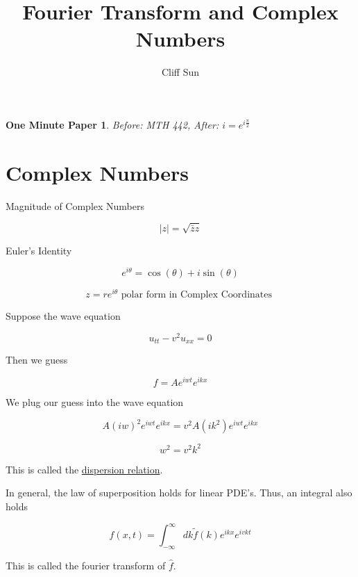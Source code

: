 \documentclass{article}
\title{Fourier Transform and Complex Numbers}
\author{Cliff Sun}
\newtheorem{one minute paper}[theorem]{One Minute Paper}
\begin{document}
\maketitle

\begin{one minute paper}
    Before: MTH 442, After: $i = e^{i\frac{\pi}{2}}$
\end{one minute paper}

\section*{Complex Numbers}

Magnitude of Complex Numbers

\begin{equation}
    |z| = \sqrt{\bar{z}z}
\end{equation}

Euler's Identity

\begin{equation}
    e^{i\theta} = \cos(\theta) + i\sin(\theta)
\end{equation}

\begin{equation}
    z = re^{i\theta} \textrm{ polar form in Complex Coordinates }
\end{equation}

Suppose the wave equation

\begin{equation}
    u_{tt} - v^2u_{xx} = 0
\end{equation}

Then we guess 

\begin{equation}
    f = Ae^{iwt}e^{ikx}
\end{equation}

We plug our guess into the wave equation

\begin{equation}
    A(iw)^2e^{iwt}e^{ikx} = v^2A(ik^2)e^{iwt}e^{ikx}
\end{equation}

\begin{equation}
    w^2 = v^2k^2
\end{equation}

This is called the \underline{dispersion relation}. 

In general, the law of superposition holds for linear PDE's. Thus, an integral also holds

\begin{equation}
    f(x,t) = \int_{-\infty}^{\infty}dk\tilde{f}(k)e^{ikx}e^{ivkt}
\end{equation}

This is called the fourier transform of $\widehat{f}$. 
\end{document}
